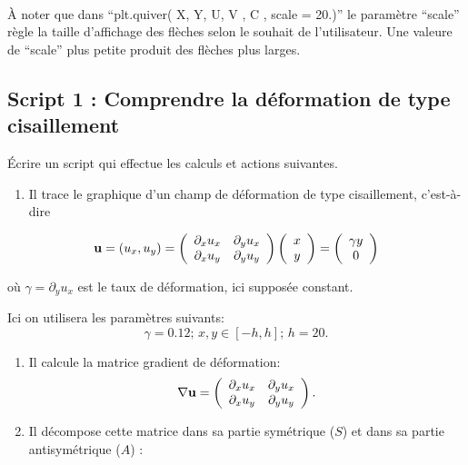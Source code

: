 \documentclass{article}
\begin{document}
    \begin{center}
    \end{center}
    { \hspace*{\fill} \\}
    
    À noter que dans ``plt.quiver( X, Y, U, V , C , scale = 20.)'' le
paramètre ``scale'' règle la taille d'affichage des flèches selon le
souhait de l'utilisateur. Une valeure de ``scale'' plus petite produit
des flèches plus larges.

    \subsection{Script 1 : Comprendre la déformation de type
cisaillement}\label{script-1-comprendre-la-duxe9formation-de-type-cisaillement}

    Écrire un script qui effectue les calculs et actions suivantes.

\begin{enumerate}
\def\labelenumi{\alph{enumi})}
\itemsep1pt\parskip0pt
\item
  Il trace le graphique d'un champ de déformation de type cisaillement,
  c'est-à-dire
\end{enumerate}

\[ {\bf u} = (u_x, u_y) = \left( \begin{array}{cc}
\partial_x u_x  & \partial_y u_x \\
\partial_x u_y  & \partial_y u_y \end{array} \right) 
\left( \begin{array}{c}
x   \\
y  \end{array} \right)=  
\left( \begin{array}{c}
\gamma y   \\
0  \end{array} \right)\]

où \(\gamma = \partial_y u_x\) est le taux de déformation, ici supposée
constant.

Ici on utilisera les paramètres suivants: \[
\gamma = 0.12; \, x,y \in [-h,h]; \, h = 20.
\]

\begin{enumerate}
\def\labelenumi{\alph{enumi})}
\setcounter{enumi}{1}
\item
  Il calcule la matrice gradient de déformation:
  \[ \nabla {\bf u} =  \left( \begin{array}{cc}
  \partial_x u_x & \partial_y u_x  \\
  \partial_x u_y & \partial_y u_y \end{array} \right). \]
\item
  Il décompose cette matrice dans sa partie symétrique (\(S\)) et dans
  sa partie antisymétrique (\(A\)) :
\end{enumerate}
\end{document}

